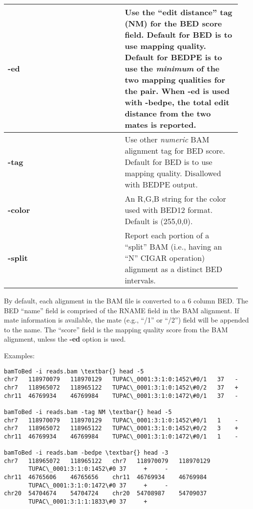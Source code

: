 \documentclass[letterpaper,10pt,english]{sphinxmanual}
\begin{document}
\begin{tabular}{|p{0.475\linewidth}|p{0.475\linewidth}|}
\textbf{-ed}
 & 
Use the ``edit distance'' tag (NM) for the BED score field. Default for BED is to use mapping quality. Default for BEDPE is to use the \emph{minimum} of the two mapping qualities for the pair. When -ed is used with -bedpe, the total edit distance from the two mates is reported.
\\\hline

\textbf{-tag}
 & 
Use other \emph{numeric} BAM alignment tag for BED score. Default for BED is to use mapping quality. Disallowed with BEDPE output.
\\\hline

\textbf{-color}
 & 
An R,G,B string for the color used with BED12 format. Default is (255,0,0).
\\\hline

\textbf{-split}
 & 
Report each portion of a ``split'' BAM (i.e., having an ``N'' CIGAR operation) alignment as a distinct BED intervals.
\\\hline
\end{tabular}


By default, each alignment in the BAM file is converted to a 6 column BED. The BED ``name'' field is
comprised of the RNAME field in the BAM alignment. If mate information is available, the mate (e.g.,
``/1'' or ``/2'') field will be appended to the name. The ``score'' field is the mapping quality score from the
BAM alignment, unless the \textbf{-ed} option is used.

Examples:

\begin{Verbatim}[commandchars=\\\{\}]
bamToBed -i reads.bam \textbar{} head -5
chr7   118970079   118970129   TUPAC\_0001:3:1:0:1452\#0/1   37   -
chr7   118965072   118965122   TUPAC\_0001:3:1:0:1452\#0/2   37   +
chr11  46769934    46769984    TUPAC\_0001:3:1:0:1472\#0/1   37   -

bamToBed -i reads.bam -tag NM \textbar{} head -5
chr7   118970079   118970129   TUPAC\_0001:3:1:0:1452\#0/1   1    -
chr7   118965072   118965122   TUPAC\_0001:3:1:0:1452\#0/2   3    +
chr11  46769934    46769984    TUPAC\_0001:3:1:0:1472\#0/1   1    -

bamToBed -i reads.bam -bedpe \textbar{} head -3
chr7   118965072   118965122   chr7   118970079   118970129
       TUPAC\_0001:3:1:0:1452\#0 37     +     -
chr11  46765606    46765656    chr11  46769934    46769984
       TUPAC\_0001:3:1:0:1472\#0 37     +     -
chr20  54704674    54704724    chr20  54708987    54709037
       TUPAC\_0001:3:1:1:1833\#0 37     +
\end{Verbatim}
\end{document}
